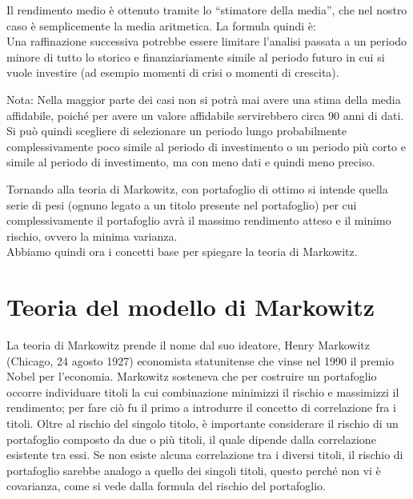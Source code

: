 Il rendimento medio è ottenuto tramite lo “stimatore della media”, che nel nostro caso è semplicemente la media aritmetica. La formula quindi è:\\
\noindent
Una raffinazione successiva potrebbe essere limitare l’analisi passata a un periodo minore di tutto lo storico e finanziariamente simile al periodo futuro in cui si vuole investire (ad esempio momenti di crisi o momenti di crescita). \\

\begin{Nota}
 Nota: Nella maggior parte dei casi non si potrà mai avere una stima della media affidabile, poiché per avere un valore affidabile servirebbero circa 90 anni di dati. Si può quindi scegliere di selezionare un periodo lungo probabilmente complessivamente poco simile al periodo di investimento o un periodo più corto e simile al periodo di investimento, ma con meno dati e quindi meno preciso.\\
\end{Nota}
\noindent
Tornando alla teoria di Markowitz, con portafoglio di ottimo si intende quella serie di pesi (ognuno legato a un titolo presente nel portafoglio) per cui complessivamente il portafoglio avrà il massimo rendimento atteso e il minimo rischio, ovvero la minima varianza.\\
Abbiamo quindi ora i concetti base per spiegare la teoria di Markowitz.

\vspace{1cm}
\section{Teoria del modello di Markowitz}

La teoria di Markowitz prende il nome dal suo ideatore, Henry Markowitz (Chicago, 24 agosto 1927)  economista statunitense che vinse nel 1990 il premio Nobel per l’economia. 
Markowitz sosteneva che per costruire un portafoglio occorre individuare titoli la cui combinazione minimizzi il rischio e massimizzi il rendimento; per fare ciò fu il primo a introdurre il concetto di correlazione fra i titoli.
Oltre al rischio del singolo titolo, è importante considerare il rischio di un portafoglio composto da due o più titoli, il quale dipende dalla correlazione esistente tra essi. Se non esiste alcuna correlazione tra i diversi titoli, il rischio di portafoglio sarebbe analogo a quello dei singoli titoli, questo perché non vi è covarianza, come si vede dalla formula del rischio del portafoglio.


